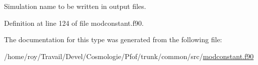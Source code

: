 Simulation name to be written in output files. 



Definition at line 124 of file modconstant.\+f90.



The documentation for this type was generated from the following file\+:\begin{DoxyCompactItemize}
\item 
/home/roy/\+Travail/\+Devel/\+Cosmologie/\+Pfof/trunk/common/src/\hyperlink{modconstant_8f90}{modconstant.\+f90}\end{DoxyCompactItemize}

